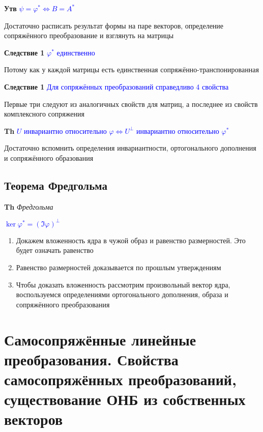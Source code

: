 \documentclass[a4paper, 14pt]{article}
\begin{document}

    \textbf{Утв} \textcolor{blue}{$\psi = \varphi^* \Leftrightarrow B = A^*$}

    Достаточно расписать результат формы на паре векторов, определение сопряжённого преобразование и взглянуть на
    матрицы

    \textbf{Следствие 1} \textcolor{blue}{$\varphi^*$ единственно}

    Потому как у каждой матрицы есть единственная сопряжённо-транспонированная

    \textbf{Следствие 1} \textcolor{blue}{Для сопряжённых преобразований справедливо 4 свойства}

    Первые три следуют из аналогичных свойств для матриц, а последнее из свойств комплексного сопряжения

    \textbf{Th} \textcolor{blue}{$U$ инвариантно относительно $\varphi \Leftrightarrow U^\bot$ инвариантно
    относительно $\varphi^*$}

    Достаточно вспомнить определения инвариантности, ортогонального дополнения и сопряжённого образования

    \subsection{Теорема Фредгольма}

    \textbf{Th} \textit{Фредгольма}

    \textcolor{blue}{$\ker \varphi^* = (\Im \varphi)^\bot$}

    \begin{enumerate}
        \item Докажем вложенность ядра в чужой образ и равенство размерностей.
        Это будет означать равенство
        \item Равенство размерностей доказывается по прошлым утверждениям
        \item Чтобы доказать вложенность рассмотрим произвольный вектор ядра, воспользуемся определениями
        ортогонального дополнения, образа и сопряжённого преобразования
    \end{enumerate}

    \section{Самосопряжённые линейные преобразования.
    Свойства самосопряжённых преобразований, существование ОНБ из собственных векторов}
\end{document}
